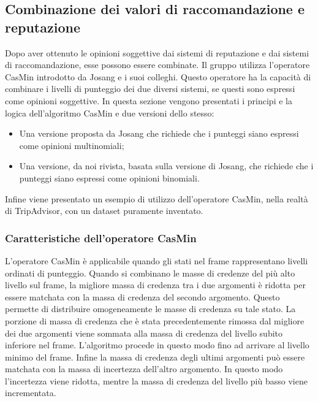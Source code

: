 \documentclass{report}
\begin{document}
	\hypertarget{header-n134}{%
		\subsection{Combinazione dei valori di raccomandazione e
			reputazione}\label{header-n134}}
	
	Dopo aver ottenuto le opinioni soggettive dai sistemi di reputazione e
	dai sistemi di raccomandazione, esse possono essere combinate. Il gruppo
	utilizza l'operatore CasMin introdotto da Josang e i suoi colleghi.
	Questo operatore ha la capacità di combinare i livelli di punteggio dei
	due diversi sistemi, se questi sono espressi come opinioni soggettive.
	In questa sezione vengono presentati i principi e la logica
	dell'algoritmo CasMin e due versioni dello stesso:
	
	\begin{itemize}
		\item
		Una versione proposta da Josang che richiede che i punteggi siano
		espressi come opinioni multinomiali;
		\item
		Una versione, da noi rivista, basata sulla versione di Josang, che
		richiede che i punteggi siano espressi come opinioni binomiali.
	\end{itemize}
	
	Infine viene presentato un esempio di utilizzo dell'operatore CasMin,
	nella realtà di TripAdvisor, con un dataset puramente inventato.
	
	\hypertarget{header-n146}{%
		\subsubsection{Caratteristiche dell'operatore
			CasMin}\label{header-n146}}
	
	L'operatore CasMin è applicabile quando gli stati nel frame
	rappresentano livelli ordinati di punteggio. Quando si combinano le
	masse di credenze del più alto livello sul frame, la migliore massa di
	credenza tra i due argomenti è ridotta per essere matchata con la massa
	di credenza del secondo argomento. Questo permette di distribuire
	omogeneamente le masse di credenza su tale stato. La porzione di massa
	di credenza che è stata precedentemente rimossa dal migliore dei due
	argomenti viene sommata alla massa di credenza del livello subito
	inferiore nel frame. L'algoritmo procede in questo modo fino ad arrivare
	al livello minimo del frame. Infine la massa di credenza degli ultimi
	argomenti può essere matchata con la massa di incertezza dell'altro
	argomento. In questo modo l'incertezza viene ridotta, mentre la massa di
	credenza del livello più basso viene incrementata.
	
\end{document}
